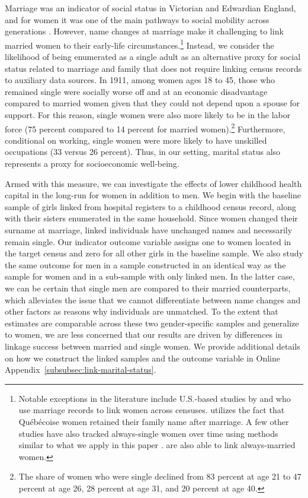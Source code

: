 \documentclass[12pt,english]{article}
\begin{document}
Marriage was an indicator of social status in Victorian and Edwardian England, and for women it was one of the main pathways to social mobility across generations \citep{Miles1999,Mitch2005}. However, name changes at marriage make it challenging to link married women to their early-life circumstances.\footnote{Notable exceptions in the literature include U.S.-based studies by \citet{CEN-2019} and \citet{Withrow-2021} who use marriage records to link women across censuses. \citet{Curtis2020} utilizes the fact that Qu\'{e}b\'{e}coise women retained their family name after marriage. A few other studies have also tracked always-single women over time using methods similar to what we apply in this paper \citep{FG-2020,PriceBVR2021}. \citet{PriceBVR2021} are also able to link always-married women.} Instead, we consider the likelihood of being enumerated as a single adult as an alternative proxy for social status related to marriage and family that does not require linking census records to auxiliary data sources. In 1911, among women ages 18 to 45, those who remained single were socially worse off and at an economic disadvantage compared to married women given that they could not depend upon a spouse for support. For this reason, single women were also more likely to be in the labor force (75 percent compared to 14 percent for married women).\footnote{The share of women who were single declined from 83 percent at age 21 to 47 percent at age 26, 28 percent at age 31, and 20 percent at age 40.} Furthermore, conditional on working, single women were more likely to have unskilled occupations (33 versus 26 percent). Thus, in our setting, marital status also represents a proxy for socioeconomic well-being.

Armed with this measure, we can investigate the effects of lower childhood health capital in the long-run for women in addition to men. We begin with the baseline sample of girls linked from hospital registers to a childhood census record, along with their sisters enumerated in the same household. Since women changed their surname at marriage, linked individuals have unchanged names and necessarily remain single. Our indicator outcome variable assigns one to women located in the target census and zero for all other girls in the baseline sample. We also study the same outcome for men in a sample constructed in an identical way as the sample for women and in a sub-sample with only linked men. In the latter case, we can be certain that single men are compared to their married counterparts, which alleviates the issue that we cannot differentiate between name changes and other factors as reasons why individuals are unmatched. To the extent that estimates are comparable across these two gender-specific samples and generalize to women, we are less concerned that our results are driven by differences in linkage success between married and single women. We provide additional details on how we construct the linked samples and the outcome variable in Online Appendix~\ref{subsubsec:link-marital-status}.
\end{document}
